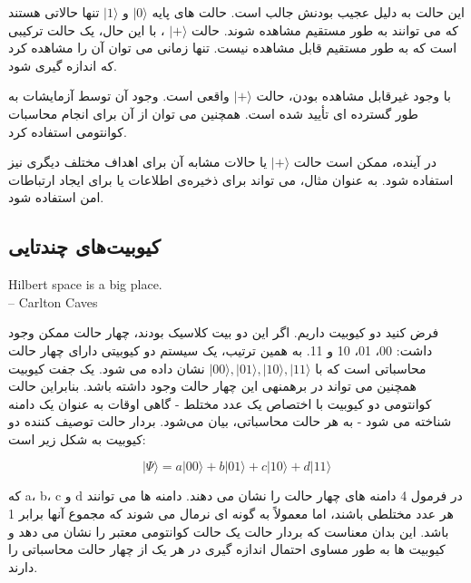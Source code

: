 \documentclass{book}
\begin{document}
این حالت به دلیل عجیب بودنش جالب است. حالت های پایه $\vert 0 \rangle$ و $\vert 1 \rangle$ تنها حالاتی هستند که می توانند به طور مستقیم مشاهده شوند. حالت $\vert + \rangle$ ، با این حال، یک حالت ترکیبی است که به طور مستقیم قابل مشاهده نیست. تنها زمانی می توان آن را مشاهده کرد که اندازه گیری شود.

با وجود غیرقابل مشاهده بودن، حالت $\vert + \rangle$ واقعی است. وجود آن توسط آزمایشات به طور گسترده ای تأیید شده است. همچنین می توان از آن برای انجام محاسبات کوانتومی استفاده کرد.

در آینده، ممکن است حالت $\vert + \rangle$ یا حالات مشابه آن برای اهداف مختلف دیگری نیز استفاده شود. به عنوان مثال، می تواند برای ذخیره‌ی اطلاعات یا برای ایجاد ارتباطات امن استفاده شود.

\subsection{کیوبیت‌های چندتایی}

\begin{latin}
	Hilbert space is a big place.\\
	\hspace{2cm}– Carlton Caves
\end{latin}




فرض کنید دو کیوبیت داریم. اگر این دو بیت کلاسیک بودند، چهار حالت ممکن وجود داشت: 00، 01، 10 و 11. به همین ترتیب، یک سیستم دو کیوبیتی دارای چهار حالت محاسباتی است که با $\vert 00 \rangle, \vert 01 \rangle, \vert 10 \rangle, \vert 11 \rangle$ نشان داده می شود. یک جفت کیوبیت همچنین می تواند در برهمنهی این چهار حالت وجود داشته باشد.
بنابراین حالت کوانتومی دو کیوبیت با اختصاص یک عدد مختلط - گاهی اوقات به عنوان یک دامنه شناخته می شود - به هر حالت محاسباتی، بیان می‌شود. بردار حالت توصیف کننده دو کیوبیت به شکل زیر است:
\begin{center}
	\begin{equation}\label{two qubit system}
		\vert \Psi \rangle = a \vert00\rangle + b \vert01\rangle + c \vert10\rangle + d \vert11\rangle 
	\end{equation}
\end{center}

که a، b، c و d در فرمول 4 دامنه های چهار حالت را نشان می دهند. دامنه ها می توانند هر عدد مختلطی باشند، اما معمولاً به گونه ای نرمال می شوند که مجموع آنها برابر 1 باشد. این بدان معناست که بردار حالت یک حالت کوانتومی معتبر را نشان می دهد و کیوبیت ها به طور مساوی احتمال اندازه گیری در هر یک از چهار حالت محاسباتی را دارند.
\pagebreak
\end{document}
